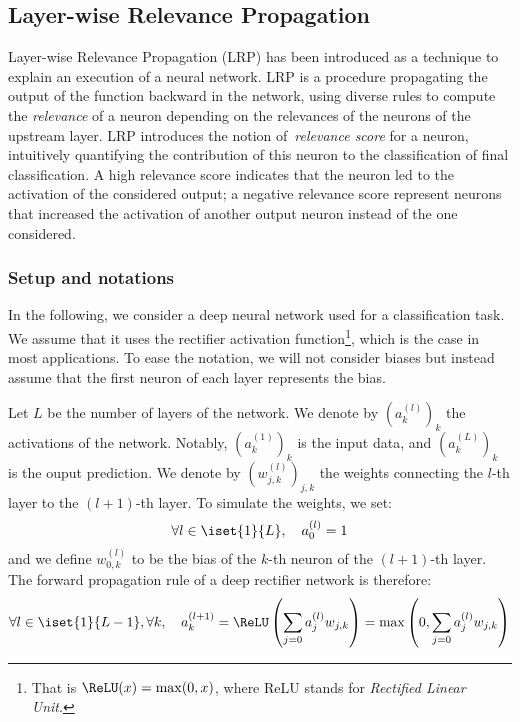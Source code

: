 \documentclass{../cs-classes/cs-classes}
\begin{document}
\subsection{Layer-wise Relevance Propagation}
Layer-wise Relevance Propagation (LRP) \cite{bach-2015} has been introduced as a technique to explain an execution of a neural network. LRP is a procedure propagating the output of the function backward in the network, using diverse rules to compute the \emph{relevance} of a neuron depending on the relevances of the neurons of the upstream layer. LRP introduces the notion of \emph{relevance score} for a neuron, intuitively quantifying the contribution of this neuron to the classification of final classification. A high relevance score indicates that the neuron led to the activation of the considered output; a negative relevance score represent neurons that increased the activation of another output neuron instead of the one considered.

\subsubsection{Setup and notations}
In the following, we consider a deep neural network used for a classification task. We assume that it uses the rectifier activation function\footnote{That is $\ReLU(x)=\max(0, x)$, where ReLU stands for \emph{Rectified Linear Unit}.}, which is the case in most applications. To ease the notation, we will not consider biases but instead assume that the first neuron of each layer represents the bias. 

Let $L$ be the number of layers of the network. We denote by $\left(a^{(l)}_k\right)_k$ the activations of the network. Notably, $\left(a^{(1)}_k\right)_k$ is the input data, and $\left(a^{(L)}_k\right)_k$ is the ouput prediction. We denote by $\left(w^{(l)}_{j, k}\right)_{j, k}$ the weights connecting the $l$-th layer to the $(l+1)$-th layer. To simulate the weights, we set:
\begin{equation*}
    \forall l\in\iset{1}{L}, \quad a^{(l)}_0 = 1
\end{equation*}
and we define $w^{(l)}_{0, k}$ to be the bias of the $k$-th neuron of the $(l+1)$-th layer. The forward propagation rule of a deep rectifier network is therefore:
\begin{equation}
    \forall l\in\iset{1}{L-1}, \forall k, \quad a^{(l+1)}_k = \ReLU\left(\sum_{j=0}a^{(l)}_j w_{j, k}\right) = \max\left(0, \sum_{j=0}a^{(l)}_j w_{j, k}\right)
\end{equation}
\end{document}
